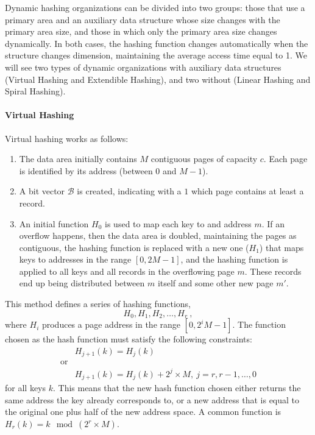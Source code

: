 Dynamic hashing organizations can be divided into two groups: those that use a primary area and an auxiliary data structure whose size changes with the primary area size, and those in which only the primary area size changes dynamically. In both cases, the hashing function changes automatically when the structure changes dimension, maintaining the average access time equal to 1. We will see two types of dynamic organizations with auxiliary data structures (Virtual Hashing and Extendible Hashing), and two without (Linear Hashing and Spiral Hashing).

\paragraph{Virtual Hashing}

Virtual hashing works as follows:
\begin{enumerate}
    \item The data area initially contains $M$ contiguous pages of capacity $c$. Each page is identified by its address (between $0$ and $M-1$).

    \item A bit vector $\mathcal{B}$ is created, indicating with a $1$ which page contains at least a record.

    \item An initial function $H_0$ is used to map each key to and address $m$. If an overflow happens, then the data area is doubled, maintaining the pages as contiguous, the hashing function is replaced with a new one ($H_1$) that maps keys to addresses in the range $[0, 2M-1]$, and the hashing function is applied to all keys and all records in the overflowing page $m$. These records end up being distributed between $m$ itself and some other new page $m'$.
\end{enumerate}
This method defines a series of hashing functions,
\begin{equation*}
    H_0, H_1, H_2, \dots, H_r \ ,
\end{equation*}
where $H_i$ produces a page address in the range $[0, 2^i M-1]$. The function chosen as the hash function must satisfy the following constraints:
\begin{align*}
    &H_{j+1}(k) = H_j(k) \\
    \text{or}\\
    &H_{j+1}(k) = H_j(k) + 2^j \times M ,\ j=r,r-1,\dots,0
\end{align*}
for all keys $k$. This means that the new hash function chosen either returns the same address the key already corresponds to, or a new address that is equal to the original one plus half of the new address space. A common function is $H_r(k) = k \mod (2^r \times M)$.

